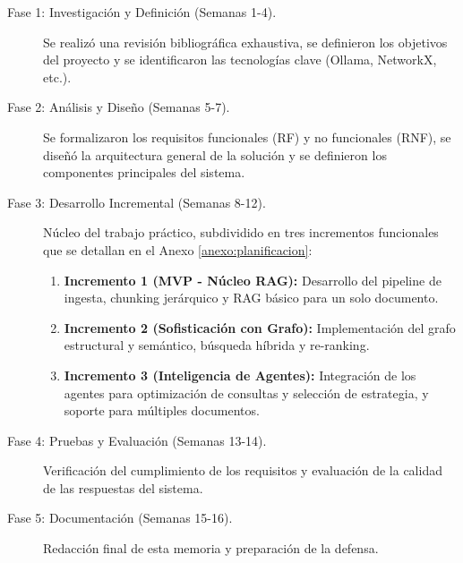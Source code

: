 \begin{description}
    \item[Fase 1: Investigación y Definición (Semanas 1-4).] Se realizó una revisión bibliográfica exhaustiva, se definieron los objetivos del proyecto y se identificaron las tecnologías clave (Ollama, NetworkX, etc.).
    \item[Fase 2: Análisis y Diseño (Semanas 5-7).] Se formalizaron los requisitos funcionales (RF) y no funcionales (RNF), se diseñó la arquitectura general de la solución y se definieron los componentes principales del sistema.
    \item[Fase 3: Desarrollo Incremental (Semanas 8-12).] Núcleo del trabajo práctico, subdividido en tres incrementos funcionales que se detallan en el Anexo \ref{anexo:planificacion}:
        \begin{enumerate}
            \item \textbf{Incremento 1 (MVP - Núcleo RAG):} Desarrollo del pipeline de ingesta, chunking jerárquico y RAG básico para un solo documento.
            \item \textbf{Incremento 2 (Sofisticación con Grafo):} Implementación del grafo estructural y semántico, búsqueda híbrida y re-ranking.
            \item \textbf{Incremento 3 (Inteligencia de Agentes):} Integración de los agentes para optimización de consultas y selección de estrategia, y soporte para múltiples documentos.
        \end{enumerate}
    \item[Fase 4: Pruebas y Evaluación (Semanas 13-14).] Verificación del cumplimiento de los requisitos y evaluación de la calidad de las respuestas del sistema.
    \item[Fase 5: Documentación (Semanas 15-16).] Redacción final de esta memoria y preparación de la defensa.
\end{description}


